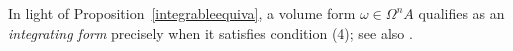 \documentclass{amsart}
\theoremstyle{definition}
\theoremstyle{remark}
\numberwithin{equation}{section}
\begin{document}
In light of Proposition~\ref{integrableequiva}, a volume form $\omega \in \Omega^n A$ qualifies as an \emph{integrating form} precisely when it satisfies condition (4); see also \cite[Remark 2.3]{BrzezinskiSitarz2017}.



    



\end{document}
